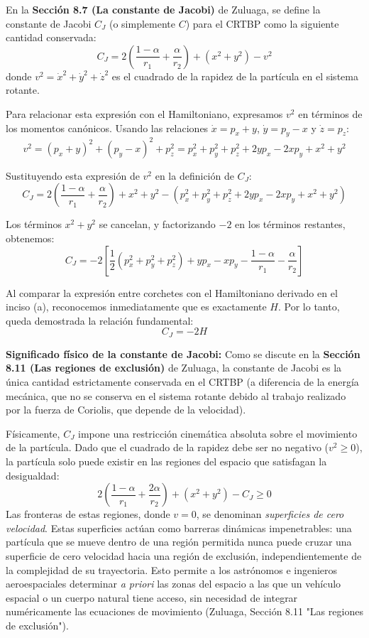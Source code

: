 \documentclass[a4paper]{article}
\begin{document}
En la \textbf{Sección 8.7 (La constante de Jacobi)} de Zuluaga, se define la constante de Jacobi $C_J$ (o simplemente $C$) para el CRTBP como la siguiente cantidad conservada:
$$C_J = 2\left(\frac{1-\alpha}{r_1} + \frac{\alpha}{r_2}\right) + (x^2 + y^2) - v^2$$
donde $v^2 = \dot{x}^2 + \dot{y}^2 + \dot{z}^2$ es el cuadrado de la rapidez de la partícula en el sistema rotante.

Para relacionar esta expresión con el Hamiltoniano, expresamos $v^2$ en términos de los momentos canónicos. Usando las relaciones $\dot{x} = p_x + y$, $\dot{y} = p_y - x$ y $\dot{z} = p_z$:
$$v^2 = (p_x + y)^2 + (p_y - x)^2 + p_z^2 = p_x^2 + p_y^2 + p_z^2 + 2yp_x - 2xp_y + x^2 + y^2$$

Sustituyendo esta expresión de $v^2$ en la definición de $C_J$:
$$C_J = 2\left(\frac{1-\alpha}{r_1} + \frac{\alpha}{r_2}\right) + x^2 + y^2 - \left( p_x^2 + p_y^2 + p_z^2 + 2yp_x - 2xp_y + x^2 + y^2 \right)$$

Los términos $x^2 + y^2$ se cancelan, y factorizando $-2$ en los términos restantes, obtenemos:
$$C_J = -2 \left[ \frac{1}{2}(p_x^2 + p_y^2 + p_z^2) + y p_x - x p_y - \frac{1-\alpha}{r_1} - \frac{\alpha}{r_2} \right]$$

Al comparar la expresión entre corchetes con el Hamiltoniano derivado en el inciso (a), reconocemos inmediatamente que es exactamente $H$. Por lo tanto, queda demostrada la relación fundamental:
$$C_J = -2H$$

\textbf{Significado físico de la constante de Jacobi:}
Como se discute en la \textbf{Sección 8.11 (Las regiones de exclusión)} de Zuluaga, la constante de Jacobi es la única cantidad estrictamente conservada en el CRTBP (a diferencia de la energía mecánica, que no se conserva en el sistema rotante debido al trabajo realizado por la fuerza de Coriolis, que depende de la velocidad). 

Físicamente, $C_J$ impone una restricción cinemática absoluta sobre el movimiento de la partícula. Dado que el cuadrado de la rapidez debe ser no negativo ($v^2 \ge 0$), la partícula solo puede existir en las regiones del espacio que satisfagan la desigualdad:
$$2\left(\frac{1-\alpha}{r_1} + \frac{2\alpha}{r_2}\right) + (x^2 + y^2) - C_J \ge 0$$
Las fronteras de estas regiones, donde $v=0$, se denominan \textit{superficies de cero velocidad}. Estas superficies actúan como barreras dinámicas impenetrables: una partícula que se mueve dentro de una región permitida nunca puede cruzar una superficie de cero velocidad hacia una región de exclusión, independientemente de la complejidad de su trayectoria. Esto permite a los astrónomos e ingenieros aeroespaciales determinar \textit{a priori} las zonas del espacio a las que un vehículo espacial o un cuerpo natural tiene acceso, sin necesidad de integrar numéricamente las ecuaciones de movimiento (Zuluaga, Sección 8.11 "Las regiones de exclusión").
\end{document}
